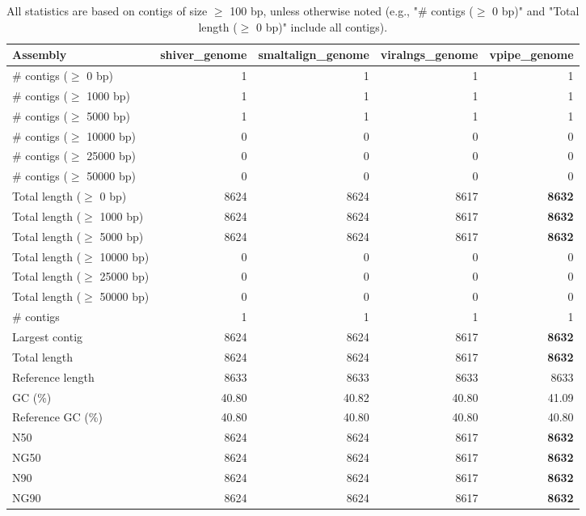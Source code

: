 \documentclass[12pt,a4paper]{article}
\begin{document}
\begin{table}[ht]
\begin{center}
\caption{All statistics are based on contigs of size $\geq$ 100 bp, unless otherwise noted (e.g., "\# contigs ($\geq$ 0 bp)" and "Total length ($\geq$ 0 bp)" include all contigs).}
\begin{tabular}{|l*{4}{|r}|}
\hline
Assembly & shiver\_genome & smaltalign\_genome & viralngs\_genome & vpipe\_genome \\ \hline
\# contigs ($\geq$ 0 bp) & 1 & 1 & 1 & 1 \\ \hline
\# contigs ($\geq$ 1000 bp) & 1 & 1 & 1 & 1 \\ \hline
\# contigs ($\geq$ 5000 bp) & 1 & 1 & 1 & 1 \\ \hline
\# contigs ($\geq$ 10000 bp) & 0 & 0 & 0 & 0 \\ \hline
\# contigs ($\geq$ 25000 bp) & 0 & 0 & 0 & 0 \\ \hline
\# contigs ($\geq$ 50000 bp) & 0 & 0 & 0 & 0 \\ \hline
Total length ($\geq$ 0 bp) & 8624 & 8624 & 8617 & {\bf 8632} \\ \hline
Total length ($\geq$ 1000 bp) & 8624 & 8624 & 8617 & {\bf 8632} \\ \hline
Total length ($\geq$ 5000 bp) & 8624 & 8624 & 8617 & {\bf 8632} \\ \hline
Total length ($\geq$ 10000 bp) & 0 & 0 & 0 & 0 \\ \hline
Total length ($\geq$ 25000 bp) & 0 & 0 & 0 & 0 \\ \hline
Total length ($\geq$ 50000 bp) & 0 & 0 & 0 & 0 \\ \hline
\# contigs & 1 & 1 & 1 & 1 \\ \hline
Largest contig & 8624 & 8624 & 8617 & {\bf 8632} \\ \hline
Total length & 8624 & 8624 & 8617 & {\bf 8632} \\ \hline
Reference length & 8633 & 8633 & 8633 & 8633 \\ \hline
GC (\%) & 40.80 & 40.82 & 40.80 & 41.09 \\ \hline
Reference GC (\%) & 40.80 & 40.80 & 40.80 & 40.80 \\ \hline
N50 & 8624 & 8624 & 8617 & {\bf 8632} \\ \hline
NG50 & 8624 & 8624 & 8617 & {\bf 8632} \\ \hline
N90 & 8624 & 8624 & 8617 & {\bf 8632} \\ \hline
NG90 & 8624 & 8624 & 8617 & {\bf 8632} \\ \hline

\end{tabular}
\end{center}
\end{table}
\end{document}
